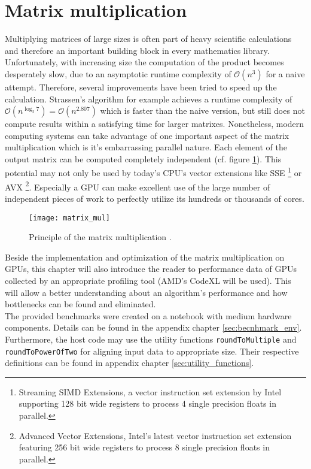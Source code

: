 \section{Matrix multiplication}
\label{sec:matrix_mul}

Multiplying matrices of large sizes is often part of heavy scientific calculations and therefore an important building block in every mathematics library. Unfortunately, with increasing size the computation of the product becomes desperately slow, due to an asymptotic runtime complexity of $\mathcal{O}(n^3)$ for a naive attempt. Therefore, several improvements have been tried to speed up the calculation. Strassen's algorithm for example achieves a runtime complexity of $\mathcal{O}(n^{\log_2 7}) = \mathcal{O}(n^{2.807})$ \cite{strassen} which is faster than the naive version, but still does not compute results within a satisfying time for larger matrixes.
Nonetheless, modern computing systems can take advantage of one important aspect of the matrix multiplication which is it's embarrassing parallel nature. Each element of the output matrix can be computed completely independent (cf. figure \ref{fig:matrix_mul}). This potential may not only be used by today's CPU's vector extensions like SSE \footnote{Streaming SIMD Extensions, a vector instruction set extension by Intel supporting 128 bit wide registers to process 4 single precision floats in parallel.} or AVX \footnote{Advanced Vector Extensions, Intel's latest vector instruction set extension featuring 256 bit wide registers to process 8 single precision floats in parallel.}. Especially a GPU can make excellent use of the large number of independent pieces of work to perfectly utilize its hundreds or thousands of cores.

\begin{figure}
\centering
\texttt{[image: matrix\_mul]}
\caption{Principle of the matrix multiplication \cite{wiki_matrix_mul}.}
\label{fig:matrix_mul}
\end{figure}

Beside the implementation and optimization of the matrix multiplication on GPUs, this chapter will also introduce the reader to performance data of GPUs collected by an appropriate profiling tool (AMD's CodeXL will be used). This will allow a better understanding about an algorithm's performance and how bottlenecks can be found and eliminated. \\
The provided benchmarks were created on a notebook with medium hardware components. Details can be found in the appendix chapter \ref{sec:becnhmark_env}. Furthermore, the host code may use the utility functions \lstinline!roundToMultiple! and \lstinline!roundToPowerOfTwo! for aligning input data to appropriate size. Their respective definitions can be found in appendix chapter \ref{sec:utility_functions}.

